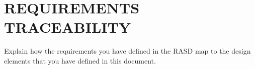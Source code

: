 \section{REQUIREMENTS TRACEABILITY}
Explain how the requirements you have defined in the RASD map to the design elements that you have defined in this document.